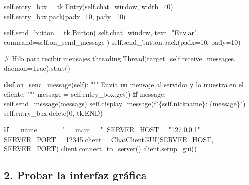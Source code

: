 \documentclass[
  a4paper,
  DIV=11,
  numbers=noendperiod,
  onepage,
  openany]{scrreprt}
\newenvironment{Shaded}{\begin{snugshade}}{\end{snugshade}}
\newcommand{\CommentTok}[1]{\textcolor[rgb]{0.37,0.37,0.37}{#1}}
\newcommand{\ControlFlowTok}[1]{\textcolor[rgb]{0.00,0.23,0.31}{\textbf{#1}}}
\newcommand{\DecValTok}[1]{\textcolor[rgb]{0.68,0.00,0.00}{#1}}
\newcommand{\KeywordTok}[1]{\textcolor[rgb]{0.00,0.23,0.31}{\textbf{#1}}}
\newcommand{\NormalTok}[1]{\textcolor[rgb]{0.00,0.23,0.31}{#1}}
\newcommand{\OperatorTok}[1]{\textcolor[rgb]{0.37,0.37,0.37}{#1}}
\newcommand{\SpecialCharTok}[1]{\textcolor[rgb]{0.37,0.37,0.37}{#1}}
\newcommand{\SpecialStringTok}[1]{\textcolor[rgb]{0.13,0.47,0.30}{#1}}
\newcommand{\StringTok}[1]{\textcolor[rgb]{0.13,0.47,0.30}{#1}}
\newcommand{\VariableTok}[1]{\textcolor[rgb]{0.07,0.07,0.07}{#1}}
\begin{document}
\begin{Shaded}
\begin{Highlighting}[]
        \VariableTok{self}\NormalTok{.entry\_box }\OperatorTok{=}\NormalTok{ tk.Entry(}\VariableTok{self}\NormalTok{.chat\_window, width}\OperatorTok{=}\DecValTok{40}\NormalTok{)}
        \VariableTok{self}\NormalTok{.entry\_box.pack(padx}\OperatorTok{=}\DecValTok{10}\NormalTok{, pady}\OperatorTok{=}\DecValTok{10}\NormalTok{)}

        \VariableTok{self}\NormalTok{.send\_button }\OperatorTok{=}\NormalTok{ tk.Button(}
            \VariableTok{self}\NormalTok{.chat\_window, text}\OperatorTok{=}\StringTok{"Enviar"}\NormalTok{, command}\OperatorTok{=}\VariableTok{self}\NormalTok{.on\_send\_message}
\NormalTok{        )}
        \VariableTok{self}\NormalTok{.send\_button.pack(padx}\OperatorTok{=}\DecValTok{10}\NormalTok{, pady}\OperatorTok{=}\DecValTok{10}\NormalTok{)}

        \CommentTok{\# Hilo para recibir mensajes}
\NormalTok{        threading.Thread(target}\OperatorTok{=}\VariableTok{self}\NormalTok{.receive\_messages, daemon}\OperatorTok{=}\VariableTok{True}\NormalTok{).start()}

    \KeywordTok{def}\NormalTok{ on\_send\_message(}\VariableTok{self}\NormalTok{):}
        \CommentTok{"""}
\CommentTok{        Envía un mensaje al servidor y lo muestra en el cliente.}
\CommentTok{        """}
\NormalTok{        message }\OperatorTok{=} \VariableTok{self}\NormalTok{.entry\_box.get()}
        \ControlFlowTok{if}\NormalTok{ message:}
            \VariableTok{self}\NormalTok{.send\_message(message)}
            \VariableTok{self}\NormalTok{.display\_message(}\SpecialStringTok{f"}\SpecialCharTok{\{}\VariableTok{self}\SpecialCharTok{.}\NormalTok{nickname}\SpecialCharTok{\}}\SpecialStringTok{: }\SpecialCharTok{\{}\NormalTok{message}\SpecialCharTok{\}}\SpecialStringTok{"}\NormalTok{)}
            \VariableTok{self}\NormalTok{.entry\_box.delete(}\DecValTok{0}\NormalTok{, tk.END)}


\ControlFlowTok{if} \VariableTok{\_\_name\_\_} \OperatorTok{==} \StringTok{"\_\_main\_\_"}\NormalTok{:}
\NormalTok{    SERVER\_HOST }\OperatorTok{=} \StringTok{"127.0.0.1"}
\NormalTok{    SERVER\_PORT }\OperatorTok{=} \DecValTok{12345}
\NormalTok{    client }\OperatorTok{=}\NormalTok{ ChatClientGUI(SERVER\_HOST, SERVER\_PORT)}
\NormalTok{    client.connect\_to\_server()}
\NormalTok{    client.setup\_gui()}
\end{Highlighting}
\end{Shaded}

\subsection{2. Probar la interfaz
gráfica}\label{probar-la-interfaz-gruxe1fica}
\end{document}
